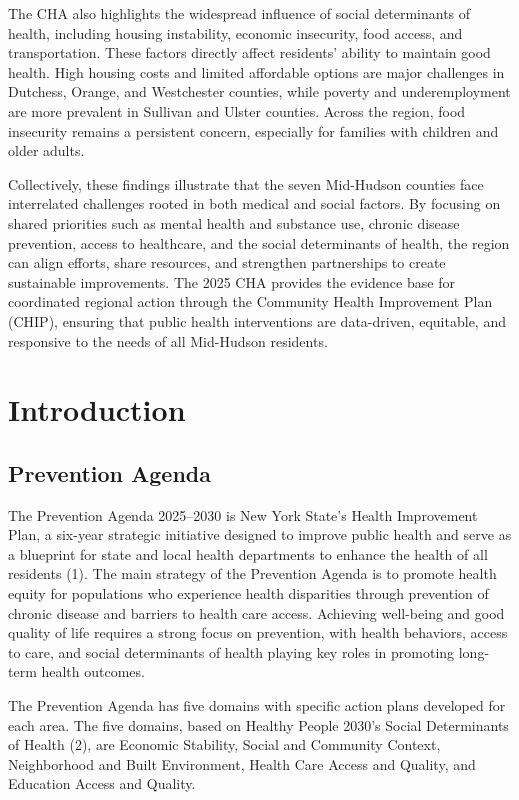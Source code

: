 \documentclass[
  english,
  letterpaper,
]{report}
\begin{document}
The CHA also highlights the widespread influence of social determinants
of health, including housing instability, economic insecurity, food
access, and transportation. These factors directly affect residents'
ability to maintain good health. High housing costs and limited
affordable options are major challenges in Dutchess, Orange, and
Westchester counties, while poverty and underemployment are more
prevalent in Sullivan and Ulster counties. Across the region, food
insecurity remains a persistent concern, especially for families with
children and older adults.

Collectively, these findings illustrate that the seven Mid-Hudson
counties face interrelated challenges rooted in both medical and social
factors. By focusing on shared priorities such as mental health and
substance use, chronic disease prevention, access to healthcare, and the
social determinants of health, the region can align efforts, share
resources, and strengthen partnerships to create sustainable
improvements. The 2025 CHA provides the evidence base for coordinated
regional action through the Community Health Improvement Plan (CHIP),
ensuring that public health interventions are data-driven, equitable,
and responsive to the needs of all Mid-Hudson residents.


\chapter{Introduction}\label{introduction}

\section{Prevention Agenda}\label{prevention-agenda}

The Prevention Agenda 2025--2030 is New York State's Health Improvement
Plan, a six-year strategic initiative designed to improve public health
and serve as a blueprint for state and local health departments to
enhance the health of all residents (1). The main strategy of the
Prevention Agenda is to promote health equity for populations who
experience health disparities through prevention of chronic disease and
barriers to health care access. Achieving well-being and good quality of
life requires a strong focus on prevention, with health behaviors,
access to care, and social determinants of health playing key roles in
promoting long-term health outcomes.

The Prevention Agenda has five domains with specific action plans
developed for each area. The five domains, based on Healthy People
2030's Social Determinants of Health (2), are Economic Stability, Social
and Community Context, Neighborhood and Built Environment, Health Care
Access and Quality, and Education Access and Quality.
\end{document}
